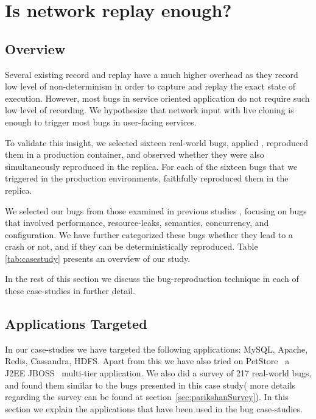 \chapter{Is network replay enough?}
\label{ch:NetworkReplaySurvey}

\section{Overview}
\label{sec:netReplayOverview}

Several existing record and replay have a much higher overhead as they record low level of non-determinism in order to capture and replay the exact state of execution. 
However, most bugs in service oriented application do not require such low level of recording.
We hypothesize that network input with live cloning is enough to trigger most bugs in user-facing services.

To validate this insight, we selected sixteen real-world bugs, applied \parikshan, reproduced them in a production container, and observed whether they were also simultaneously reproduced in the replica.
For each of the sixteen bugs that we triggered in the production environments, \parikshan faithfully reproduced them in the replica. 

We selected our bugs from those examined in previous studies \cite{bugbench,simpleTesting}, focusing on bugs that involved performance, resource-leaks, semantics, concurrency, and configuration. 
We have further categorized these bugs whether they lead to a crash or not, and if they can be deterministically reproduced.
Table \ref{tab:casestudy} presents an overview of our study.

In the rest of this section we discuss the bug-reproduction technique in each of these case-studies in further detail.



\section{Applications Targeted}

In our case-studies we have targeted the following applications: MySQL, Apache, Redis, Cassandra, HDFS. Apart from this we have also tried \parikshan on PetStore~\cite{petstore} a J2EE JBOSS~\cite{jboss} multi-tier application. We also did a survey of 217 real-world bugs, and found them similar to the bugs presented in this case study( more details regarding the survey can be found at section~\ref{sec:parikshanSurvey}).
In this section we explain the applications that have been used in the bug case-studies.

